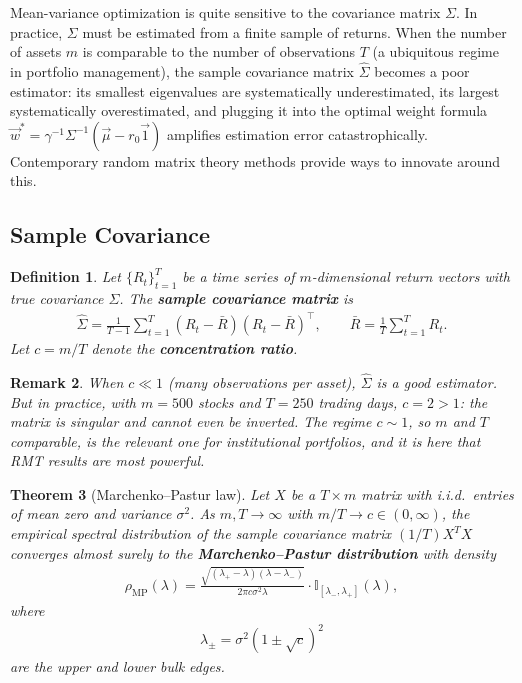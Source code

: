 \documentclass{report}
\theoremstyle{spacedplain}
\newtheorem{theorem}{Theorem}[section]
\theoremstyle{spaceddefinition}
\newtheorem{definition}[theorem]{Definition}
\theoremstyle{spacedremark}
\newtheorem{remark}[theorem]{Remark}
\begin{document}
Mean-variance optimization is quite sensitive to the covariance matrix $\Sigma$. In practice, $\Sigma$ must be estimated from a finite sample of returns. When the number of assets $m$ is comparable to the number of observations $T$ (a ubiquitous regime in portfolio management), the sample
covariance matrix $\hat{\Sigma}$ becomes a poor estimator: its smallest eigenvalues are systematically underestimated, its largest systematically overestimated, and plugging it into the optimal weight formula $\vec{w}^* = \gamma^{-1}\Sigma^{-1}(\vec{\mu}-r_0\vec{1})$ amplifies estimation error catastrophically. Contemporary random matrix theory methods provide ways to innovate around this.
 
\subsection{Sample Covariance}
 
\begin{definition}
Let $\{R_t\}_{t=1}^T$ be a time series of $m$-dimensional return vectors with true covariance $\Sigma$. The \textbf{sample covariance matrix} is
\begin{align}
    \hat{\Sigma} = \frac{1}{T-1}\sum_{t=1}^T (R_t - \bar{R})(R_t - \bar{R})^\top,
    \qquad \bar{R} = \frac{1}{T}\sum_{t=1}^T R_t.
\end{align}
Let $c = m/T$ denote the \textbf{concentration ratio}.
\end{definition}
 
\begin{remark}
When $c \ll 1$ (many observations per asset), $\hat{\Sigma}$ is a good estimator. But in practice, with $m = 500$ stocks and $T = 250$ trading days, $c = 2 > 1$: the matrix is singular and cannot even be inverted. The regime $c \sim 1$, so $m$ and $T$ comparable, is the relevant one for institutional portfolios, and it is here that RMT results are most powerful.
\end{remark}
 
\begin{theorem}[Marchenko--Pastur law]
Let $X$ be a $T \times m$ matrix with i.i.d.\ entries of mean zero and variance $\sigma^2$. As $m, T \to \infty$ with $m/T \to c \in (0,\infty)$, the empirical spectral distribution of the sample covariance matrix $(1/T)X^T X$ converges almost surely to the \textbf{Marchenko--Pastur distribution} with density
\begin{align}
    \rho_{\mathrm{MP}}(\lambda) =
    \frac{\sqrt{(\lambda_+ - \lambda)(\lambda - \lambda_-)}}{2\pi c \sigma^2 \lambda}
    \cdot \mathbb{I}_{[\lambda_-, \lambda_+]}(\lambda),
\end{align}
where
\begin{align}
    \lambda_\pm = \sigma^2(1 \pm \sqrt{c})^2
\end{align}
are the upper and lower bulk edges.
\end{theorem}
 
\end{document}
